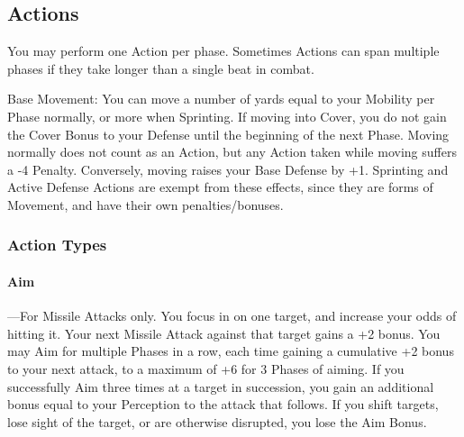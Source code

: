 \documentclass[oneside,11pt,english]{book}
\begin{document}
\subsection{Actions}
You may perform one Action per phase. Sometimes Actions can span multiple phases if they take longer
than a single beat in combat.

Base Movement: You can move a number of yards equal to your Mobility per Phase normally, or more
when Sprinting. If moving into Cover, you do not gain the Cover Bonus to your Defense until the
beginning of the next Phase.
Moving normally does not count as an Action, but any Action taken while moving suffers a -4 Penalty.
Conversely, moving raises your Base Defense by +1. Sprinting and Active Defense Actions are exempt
from these effects, since they are forms of Movement, and have their own penalties/bonuses.
\subsubsection{Action Types}
\paragraph{Aim}---\quad For Missile Attacks only. You focus in on one target, and increase your odds of hitting it. Your next
Missile Attack against that target gains a +2 bonus. You may Aim for multiple Phases in a row, each time
gaining a cumulative +2 bonus to your next attack, to a maximum of +6 for 3 Phases of aiming. If you
successfully Aim three times at a target in succession, you gain an additional bonus equal to your
Perception to the attack that follows. If you shift targets, lose sight of the target, or are otherwise
disrupted, you lose the Aim Bonus.
\end{document}
